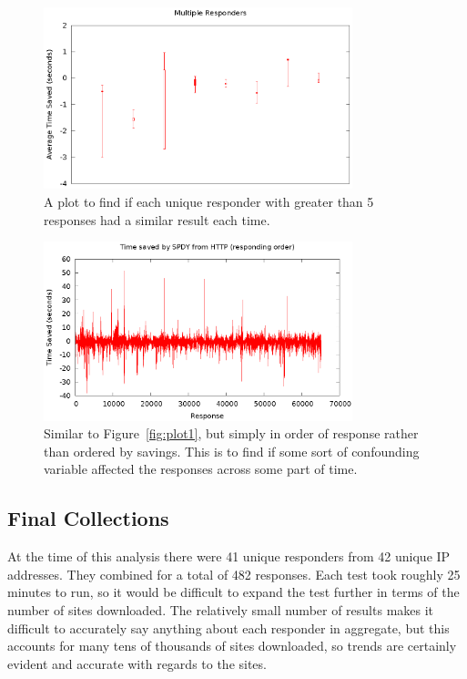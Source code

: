 \documentclass[10pt,letterpaper,notitlepage]{article}
\begin{document}
\begin{figure}[H]
\centering
\includegraphics[width=0.8\textwidth]{plots/plot5.eps}
\caption{A plot to find if each unique responder with greater than 5 responses
had a similar result each time.}
\label{fig:plot5}
\end{figure}

\begin{figure}[H]
\centering
\includegraphics[width=0.8\textwidth]{plots/plot6.eps}
\caption{Similar to Figure~\ref{fig:plot1}, but simply in order of response
    rather than ordered by savings.  This is to find if some sort of confounding
variable affected the responses across some part of time.}
\label{fig:plot6}
\end{figure}


\subsection{Final Collections}
\label{sec:realworld/fc}
At the time of this analysis there were 41 unique responders from 42 unique IP
addresses. They combined for a total of 482 responses.  Each test took roughly
25 minutes to run, so it would be difficult to expand the test further in terms
of the number of sites downloaded.  The relatively small number of results makes
it difficult to accurately say anything about each responder in aggregate, but
this accounts for many tens of thousands of sites downloaded, so trends are
certainly evident and accurate with regards to the sites.
\end{document}
